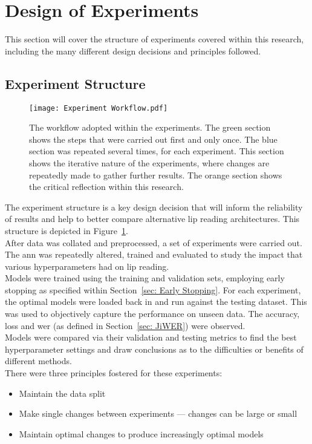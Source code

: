 \section{Design of Experiments}
This section will cover the structure of experiments covered within this research, including the many different design decisions and principles followed.
\subsection{Experiment Structure}
\begin{figure}
\centering
\texttt{[image: Experiment Workflow.pdf]}
\caption[The workflow adopted within the experiments.]{The workflow adopted within the experiments. The green section shows the steps that were carried out first and only once. The blue section was repeated several times, for each experiment. This section shows the iterative nature of the experiments, where changes are repeatedly made to gather further results. The orange section shows the critical reflection within this research.}
\label{fig:experiment workflow}
\end{figure}
The experiment structure is a key design decision that will inform the reliability of results and help to better compare alternative lip reading architectures. This structure is depicted in Figure~\ref{fig:experiment workflow}.\\
After data was collated and preprocessed, a set of experiments were carried out. The \acrshort{ann} was repeatedly altered, trained and evaluated to study the impact that various hyperparameters had on lip reading.\\
Models were trained using the training and validation sets, employing early stopping as specified within Section~\ref{sec: Early Stopping}. For each experiment, the optimal models were loaded back in and run against the testing dataset. This was used to objectively capture the performance on unseen data. The accuracy, loss and \acrfull{wer} (as defined in Section~\ref{sec: JiWER}) were observed.\\
Models were compared via their validation and testing metrics to find the best hyperparameter settings and draw conclusions as to the difficulties or benefits of different methods.\\
There were three principles fostered for these experiments:
\begin{itemize}
    \item Maintain the data split
    \item Make single changes between experiments --- changes can be large or small
    \item Maintain optimal changes to produce increasingly optimal models
\end{itemize}
